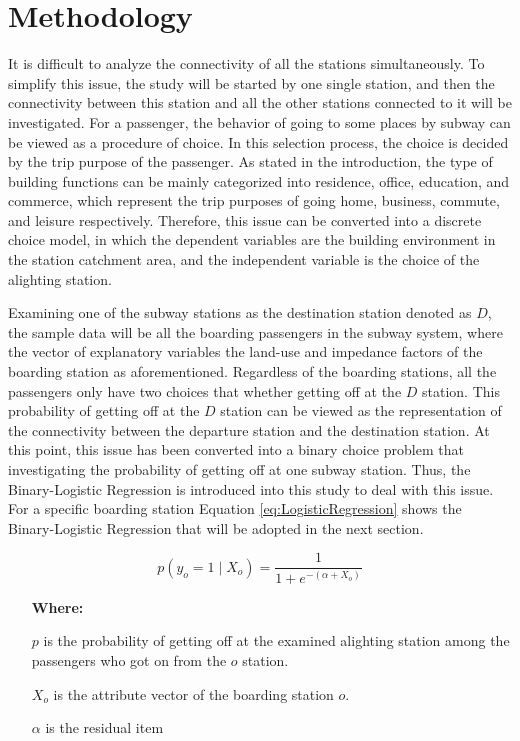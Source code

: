 \documentclass[utf8]{article}
\begin{document}
\section{Methodology}
\indent

%
It is difficult to analyze the connectivity of all the stations simultaneously. To simplify this issue, the study will be started by one single station, and then the connectivity between this station and all the other stations connected to it will be investigated. For a passenger, the behavior of going to some places by subway can be viewed as a procedure of choice. In this selection process, the choice is decided by the trip purpose of the passenger. As stated in the introduction, the type of building functions can be mainly categorized into residence, office, education, and commerce, which represent the trip purposes of going home, business, commute, and leisure respectively. Therefore, this issue can be converted into a discrete choice model, in which the dependent variables are the building environment in the station catchment area, and the independent variable is the choice of the alighting station. 

%
Examining one of the subway stations as the destination station denoted as $D$, the sample data will be all the boarding passengers in the subway system, where the vector of explanatory variables the land-use and impedance factors of the boarding station as aforementioned. Regardless of the boarding stations, all the passengers only have two choices that whether getting off at the $D$ station. This probability of getting off at the $D$ station can be viewed as the representation of the connectivity between the departure station and the destination station. At this point, this issue has been converted into a binary choice problem that investigating the probability of getting off at one subway station. Thus, the Binary-Logistic Regression is introduced into this study to deal with this issue. For a specific boarding station Equation \ref{eq:LogisticRegression} shows the Binary-Logistic Regression that will be adopted in the next section.

\begin{equation}
p(y_o=1 \mid X_o)=\frac{1}{1+e^{-(\alpha +X_o)}}
\label{eq:LogisticRegression}
\end{equation}

\begin{enumerate}
	\item[\textbf{Where:}]
	\item[$p$] is the probability of getting off at the examined alighting station among the passengers who got on from the $o$ station.
	\item[$X_o$] is the attribute vector of the boarding station $o$.
	\item[$\alpha$] is the residual item
\end{enumerate}
\end{document}
